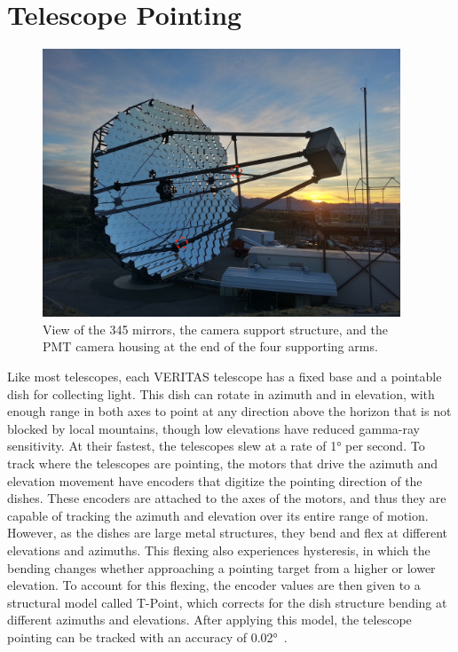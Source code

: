 \section{Telescope Pointing}\label{sec:telpoint}

\begin{figure}[ht]
  \centering
  \includegraphics[width=0.95\textwidth]{images/single_telescope}
  \caption[Single VERITAS Telescope]{
    View of the 345 mirrors, the camera support structure, and the PMT camera housing at the end of the four supporting arms.}
  \label{fig:davcottel}
\end{figure}

Like most telescopes, each VERITAS telescope has a fixed base and a pointable dish for collecting light.
This dish can rotate in azimuth and in elevation, with enough range in both axes to point at any direction above the horizon that is not blocked by local mountains, though low elevations have reduced gamma-ray sensitivity.
At their fastest, the telescopes slew at a rate of \nicetilde{}\ang{1} per second.
To track where the telescopes are pointing, the motors that drive the azimuth and elevation movement have encoders that digitize the pointing direction of the dishes.
These encoders are attached to the axes of the motors, and thus they are capable of tracking the azimuth and elevation over its entire range of motion.
However, as the dishes are large metal structures, they bend and flex at different elevations and azimuths.
This flexing also experiences hysteresis, in which the bending changes whether approaching a pointing target from a higher or lower elevation.
To account for this flexing, the encoder values are then given to a structural model called T-Point, which corrects for the dish structure bending at different azimuths and elevations.
After applying this model, the telescope pointing can be tracked with an accuracy of \nicetilde{}\ang{0.02}~\cite{holder2008status}.

